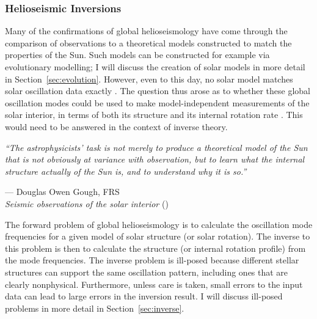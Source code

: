 \subsubsection*{Helioseismic Inversions}
Many of the confirmations of global helioseismology have come through the comparison of observations to a theoretical models constructed to match the properties of the Sun. %
Such models can be constructed for example via evolutionary modelling; I will discuss the creation of solar models in more detail in Section~\ref{sec:evolution}. 
However, even to this day, no solar model matches solar oscillation data exactly \citep[e.g.,][]{1980Natur.288..544C}. 
The question thus arose as to whether these global oscillation modes could be used to make model-independent measurements of the solar interior, in terms of both its structure and its internal rotation rate \citep[e.g.,][]{1976Natur.259...89C, 1981MNRAS.196..731G}. 
This would need to be answered in the context of inverse theory. 

\epigraph{\emph{``The astrophysicists' task is not merely to produce a theoretical model of the Sun \hphantom{``}that is not obviously at variance with observation, but to learn what the internal \hphantom{``}structure actually of the Sun is, and to understand why it is so.''
}}{--- Douglas Owen Gough, FRS \\ 
\textit{Seismic observations of the solar interior} (\citeyear{1991ARA&A..29..627G})}

The forward problem of global helioseismology is to calculate the oscillation mode frequencies for a given model of solar structure (or solar rotation). 
The inverse to this problem is then to calculate the structure (or internal rotation profile) from the mode frequencies. 
The inverse problem is ill-posed because different stellar structures can support the same oscillation pattern, including ones that are clearly nonphysical. 
Furthermore, unless care is taken, small errors to the input data can lead to large errors in the inversion result. 
I will discuss ill-posed problems in more detail in Section~\ref{sec:inverse}. 

